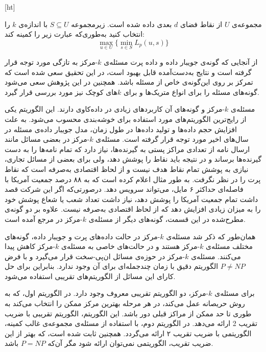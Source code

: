 [ht]

مجموعه‌ی $U$ از نقاط فضای $d$ بعدی داده شده است. زیرمجموعه $S \subseteq U$ با اندازه‌ی $k$ را انتخاب کنید به‌طوری‌که عبارت زیر را کمینه کند:
$$\max_{u \in U} \{ \min_{s \in S} L_p(u, s) \}$$

از آنجایی که گونه‌ی جویبار داده و داده پرت مسئله‌ی $k$-مرکز به تازگی مورد توجه قرار گرفته است و نتایج به‌دست‌آمده قابل بهبود است، در این تحقیق سعی شده است که تمرکز بر روی این‌گونه‌ی خاص از مسئله باشد. همچنین در این پژوهش سعی می‌شود گونه‌های مسئله را برای انواع متریک‌ها و برای $k$های کوچک نیز مورد بررسی قرار گیرد. 


مسئله‌ی $k$-مرکز و گونه‌های آن کاربردهای زیادی در داده‌کاوی دارند. این الگوریتم یکی از رایج‌ترین الگوریتم‌های مورد استفاده برای خوشه‌بندی محسوب می‌شود. به علت افزایش حجم داده‌ها و تولید داده‌ها در طول زمان، مدل جویبار داده‌ی مسئله در سال‌های اخیر مورد توجه قرار گرفته است. مسئله‌ی $k$-مرکز در بعضی مسائل مانند ارسال نامه از‌ تعدادی مراکز پستی به گیرنده‌ها، نیاز دارد که تمام نامه‌ها را به دست گیرنده‌ها برساند و در نتیجه باید نقاط را پوشش دهد، ولی برای بعضی از مسائل تجاری، نیازی به پوشش تمام نقاط هدف نیست و از لحاظ اقتصادی به‌صرفه است که نقاط پرت را در نظر نگرفت. به طور مثال  اعلام کرده است که به ۸۸ درصد جمعیت آمریکا با فاصله‌ای حداکثر ۶ مایل، می‌تواند سرویس دهد. درصورتی‌که اگر این شرکت قصد داشت تمام جمعیت آمریکا را پوشش دهد، نیاز داشت تعداد شعب یا شعاع پوشش خود را به میزان زیادی افزایش دهد که از لحاظ اقتصادی به‌صرفه نیست. علاوه بر دو گونه‌ی مطرح‌شده در این قسمت، گونه‌های دیگر از مسئله‌ی $k$-مرکز در مرجع  آمده است.


همان‌طور که ذکر شد مسئله‌ی $k$-مرکز در حالت داده‌های پرت و جویبار داده، گونه‌های مختلف مسئله‌ی $k$-مرکز هستند و در حالت‌های خاصی به مسئله‌ی $k$-مرکز کاهش پیدا می‌کنند. مسئله‌ی $k$-مرکز در حوزه‌ی مسائل ان‌پی-سخت قرار می‌گیرد و با فرض $P \neq NP$ الگوریتم دقیق با زمان چندجمله‌ای برای آن وجود ندارد. بنابراین برای حل کارای این مسائل از الگوریتم‌های تقریبی  استفاده می‌شود.

برای مسئله‌ی $k$-مرکز، دو الگوریتم تقریبی معروف وجود دارد.
در الگوریتم اول، که به روش حریصانه عمل می‌کند، در هر مرحله بهترین مرکز ممکن را انتخاب می‌کند به طوری تا حد ممکن از مراکز‌ قبلی دور باشد. این الگوریتم، الگوریتم تقریبی با ضریب تقریب 2 ارائه می‌دهد.
در الگوریتم دوم، با استفاده از مسئله‌ی مجموعه‌ی غالب کمینه، الگوریتمی با ضریب تقریب ۲ ارائه می‌گردد.
همچنین ثابت شده است، که بهتر از این ضریب تقریب، الگوریتمی نمی‌توان ارائه شود مگر آن‌که $P = NP$ باشد.



